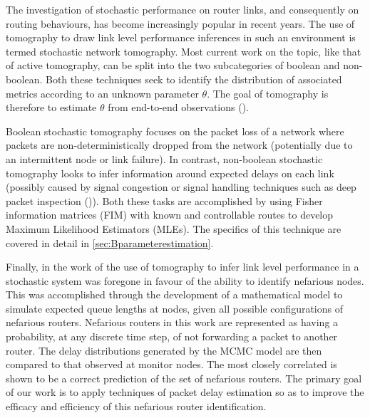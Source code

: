 The investigation of stochastic performance on router links, and consequently on routing behaviours, has become increasingly popular in recent years. The use of tomography to draw link level performance inferences in such an environment is termed stochastic network tomography. Most current work on the topic, like that of active tomography, can be split into the two subcategories of boolean and non-boolean. Both these techniques seek to identify the distribution of associated metrics according to an unknown parameter $\theta$. The goal of tomography is therefore to estimate $\theta$ from end-to-end observations (\cite{he_fisher_2015}).\par
Boolean stochastic tomography focuses on the packet loss of a network where packets are non-deterministically dropped from the network (potentially due to an intermittent node or link failure). In contrast, non-boolean stochastic tomography looks to infer information around expected delays on each link (possibly caused by signal congestion or signal handling techniques such as deep packet inspection (\cite{el-maghraby_survey_2017})). Both these tasks are accomplished by using Fisher information matrices (FIM) with known and controllable routes to develop Maximum Likelihood Estimators (MLEs). The specifics of this technique are covered in detail in \cref{sec:Bparameterestimation}.\par
Finally, in the work of \cite{barnes_stochastic_2020} the use of tomography to infer link level performance in a stochastic system was foregone in favour of the ability to identify nefarious nodes. This was accomplished through the development of a mathematical model to simulate expected queue lengths at nodes, given all possible configurations of nefarious routers. Nefarious routers in this work are represented as having a probability, at any discrete time step, of not forwarding a packet to another router. The delay distributions generated by the MCMC model are then compared to that observed at monitor nodes. The most closely correlated is shown to be a correct prediction of the set of nefarious routers. The primary goal of our work is to apply techniques of packet delay estimation so as to improve the efficacy and efficiency of this nefarious router identification.\par